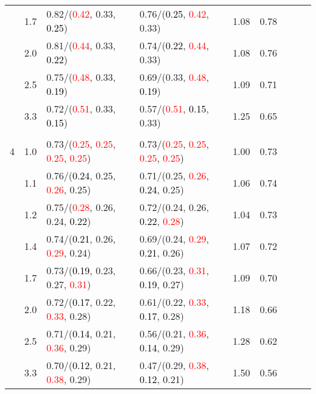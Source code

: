 \documentclass[10pt,a4paper]{report}
\begin{document}
\begin{table}[!htbp]
\begin{center}
{\begin{tabular}{ccllccccc}
			&1.7&0.82/(\textcolor{red}{0.42}, 0.33, \textcolor{black}{0.25})&0.76/(\textcolor{black}{0.25}, \textcolor{red}{0.42}, 0.33)&1.08&0.78\\
			&2.0&0.81/(\textcolor{red}{0.44}, 0.33, \textcolor{black}{0.22})&0.74/(\textcolor{black}{0.22}, \textcolor{red}{0.44}, 0.33)&1.08&0.76\\
			&2.5&0.75/(\textcolor{red}{0.48}, 0.33, \textcolor{black}{0.19})&0.69/(0.33, \textcolor{red}{0.48}, \textcolor{black}{0.19})&1.09&0.71\\
			&3.3&0.72/(\textcolor{red}{0.51}, 0.33, \textcolor{black}{0.15})&0.57/(\textcolor{red}{0.51}, \textcolor{black}{0.15}, 0.33)&1.25&0.65\\
			&&&&\\
			4			&1.0&0.73/(\textcolor{red}{0.25}, \textcolor{red}{0.25}, \textcolor{red}{0.25}, \textcolor{red}{0.25})&0.73/(\textcolor{red}{0.25}, \textcolor{red}{0.25}, \textcolor{red}{0.25}, \textcolor{red}{0.25})&1.00&0.73\\
			&1.1&0.76/(\textcolor{black}{0.24}, 0.25, \textcolor{red}{0.26}, 0.25)&0.71/(0.25, \textcolor{red}{0.26}, \textcolor{black}{0.24}, 0.25)&1.06&0.74\\
			&1.2&0.75/(\textcolor{red}{0.28}, 0.26, 0.24, \textcolor{black}{0.22})&0.72/(0.24, 0.26, \textcolor{black}{0.22}, \textcolor{red}{0.28})&1.04&0.73\\
			&1.4&0.74/(\textcolor{black}{0.21}, 0.26, \textcolor{red}{0.29}, 0.24)&0.69/(0.24, \textcolor{red}{0.29}, \textcolor{black}{0.21}, 0.26)&1.07&0.72\\
			&1.7&0.73/(\textcolor{black}{0.19}, 0.23, 0.27, \textcolor{red}{0.31})&0.66/(0.23, \textcolor{red}{0.31}, \textcolor{black}{0.19}, 0.27)&1.09&0.70\\
			&2.0&0.72/(\textcolor{black}{0.17}, 0.22, \textcolor{red}{0.33}, 0.28)&0.61/(0.22, \textcolor{red}{0.33}, \textcolor{black}{0.17}, 0.28)&1.18&0.66\\
			&2.5&0.71/(\textcolor{black}{0.14}, 0.21, \textcolor{red}{0.36}, 0.29)&0.56/(0.21, \textcolor{red}{0.36}, \textcolor{black}{0.14}, 0.29)&1.28&0.62\\
			&3.3&0.70/(\textcolor{black}{0.12}, 0.21, \textcolor{red}{0.38}, 0.29)&0.47/(0.29, \textcolor{red}{0.38}, \textcolor{black}{0.12}, 0.21)&1.50&0.56\\
			\bottomrule
		\end{tabular}}
	\end{center}
\end{table}
\end{document}
